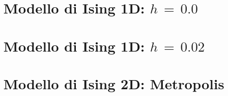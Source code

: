 \appendix 


\section{Modello di Ising 1D: $h\,=\,0.0$}


\section{Modello di Ising 1D: $h\,=\,0.02$}




\section{Modello di Ising 2D: Metropolis}
